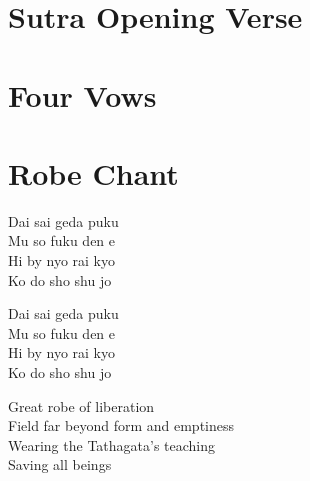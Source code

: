\documentclass{chant-card}
\begin{document}
\fontsize{12pt}{14pt}\selectfont

\section{Sutra Opening Verse}
\begin{center}
  \sutraOpeningVerse
\end{center}

\section{Four Vows}
\begin{center}
  \fourVows
\end{center}

\newpage

\section{Robe Chant}
\def\robechant{%
\begin{center}
Dai sai geda puku\\
Mu so fuku den e\\
Hi by nyo rai kyo\\
Ko do sho shu jo
\end{center}}
\parbox[b]{.5\textwidth}{\robechant}
\parbox[b]{.5\textwidth}{\robechant}
\begin{center}
  Great robe of liberation\\
  Field far beyond form and emptiness\\
  Wearing the Tathagata's teaching\\
  Saving all beings
\end{center}
\end{document}
